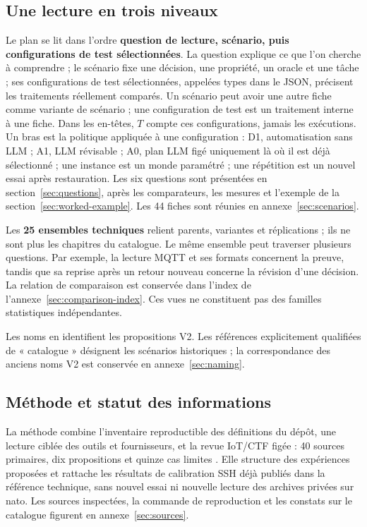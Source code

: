\documentclass[11pt,a4paper]{article}
\newcommand{\code}[1]{{\small\ttfamily\path{#1}}}
\begin{document}
\subsection{Une lecture en trois niveaux}
Le plan se lit dans l’ordre \textbf{question de lecture, scénario, puis configurations de test sélectionnées}. La question explique ce que l’on cherche à comprendre ; le scénario fixe une décision, une propriété, un oracle et une tâche ; ses configurations de test sélectionnées, appelées types dans le JSON, précisent les traitements réellement comparés. Un scénario peut avoir une autre fiche comme variante de scénario ; une configuration de test est un traitement interne à une fiche. Dans les en-têtes, $T$ compte ces configurations, jamais les exécutions. Un bras est la politique appliquée à une configuration : D1, automatisation sans LLM ; A1, LLM révisable ; A0, plan LLM figé uniquement là où il est déjà sélectionné ; une instance est un monde paramétré ; une répétition est un nouvel essai après restauration. Les six questions sont présentées en section~\ref{sec:questions}, après les comparateurs, les mesures et l’exemple de la section~\ref{sec:worked-example}. Les 44 fiches sont réunies en annexe~\ref{sec:scenarios}.

Les \textbf{25 ensembles techniques} relient parents, variantes et réplications ; ils ne sont plus les chapitres du catalogue. Le même ensemble peut traverser plusieurs questions. Par exemple, la lecture MQTT et ses formats concernent la preuve, tandis que sa reprise après un retour nouveau concerne la révision d’une décision. La relation de comparaison est conservée dans l’index de l’annexe~\ref{sec:comparison-index}. Ces vues ne constituent pas des familles statistiques indépendantes.

Les noms en \code{s_} identifient les propositions V2. Les références explicitement qualifiées de « catalogue » désignent les scénarios historiques ; la correspondance des anciens noms V2 est conservée en annexe~\ref{sec:naming}.

\subsection{Méthode et statut des informations}
La méthode combine l’inventaire reproductible des définitions du dépôt, une lecture ciblée des outils et fournisseurs, et la revue IoT/CTF figée : 40 sources primaires, dix propositions et quinze cas limites \cite{iotreview}. Elle structure des expériences proposées et rattache les résultats de calibration SSH déjà publiés dans la référence technique, sans nouvel essai ni nouvelle lecture des archives privées sur nato. Les sources inspectées, la commande de reproduction et les constats sur le catalogue figurent en annexe~\ref{sec:sources}.
\end{document}
